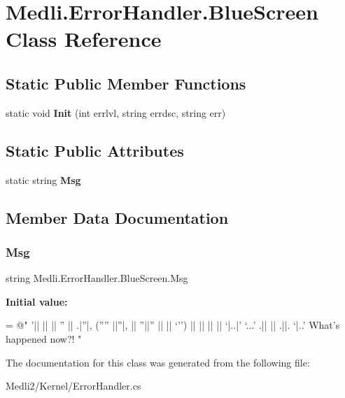 \hypertarget{class_medli_1_1_error_handler_1_1_blue_screen}{}\section{Medli.\+Error\+Handler.\+Blue\+Screen Class Reference}
\label{class_medli_1_1_error_handler_1_1_blue_screen}
\subsection*{Static Public Member Functions}
\begin{DoxyCompactItemize}
\item 
\mbox{\label{class_medli_1_1_error_handler_1_1_blue_screen_ac7908a738b73eba568e1638c0b7a679d}} 
static void {\bfseries Init} (int errlvl, string errdsc, string err)
\end{DoxyCompactItemize}
\subsection*{Static Public Attributes}
\begin{DoxyCompactItemize}
\item 
static string {\bfseries Msg}
\end{DoxyCompactItemize}


\subsection{Member Data Documentation}
\mbox{\label{class_medli_1_1_error_handler_1_1_blue_screen_a7f3848cb32f648169c51afbb1d7c5b85}} 
\subsubsection{\texorpdfstring{Msg}{Msg}}
{\footnotesize\ttfamily string Medli.\+Error\+Handler.\+Blue\+Screen.\+Msg\hspace{0.3cm}{\ttfamily [static]}}

{\bfseries Initial value\+:}
\begin{DoxyCode}
= \textcolor{stringliteral}{@"}
\textcolor{stringliteral}{}
\textcolor{stringliteral}{                '||            ||    }
\textcolor{stringliteral}{                 ||      ''    ||    }
\textcolor{stringliteral}{.|''|,    (''''  ||''|,  ||  ''||''  }
\textcolor{stringliteral}{||  ||     `'')  ||  ||  ||    ||    }
\textcolor{stringliteral}{`|..|'    `...' .||  || .||.   `|..'}
\textcolor{stringliteral}{}
\textcolor{stringliteral}{What's happened now?! "}
\end{DoxyCode}


The documentation for this class was generated from the following file\+:\begin{DoxyCompactItemize}
\item 
Medli2/\+Kernel/Error\+Handler.\+cs\end{DoxyCompactItemize}
